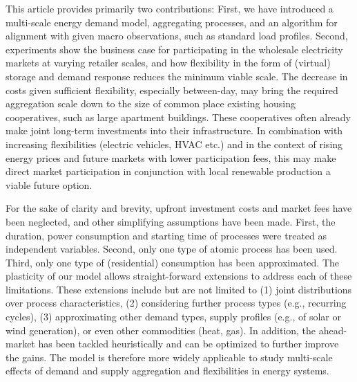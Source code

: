 \documentclass[conference]{IEEEtran}
\begin{document}
This article provides primarily two contributions: First, we have introduced a multi-scale energy demand model, aggregating processes, and an algorithm for alignment with given macro observations, such as standard load profiles. %
Second, experiments show the business case for participating in the wholesale electricity markets at varying retailer scales, and how flexibility in the form of (virtual) storage and demand response reduces the minimum viable scale. The decrease in costs given sufficient flexibility, especially between-day, may bring the required aggregation scale down to the size of common place existing housing cooperatives, such as large apartment buildings. These cooperatives often already make joint long-term investments into their infrastructure. In combination with increasing flexibilities (electric vehicles, HVAC etc.) and in the context of rising energy prices and future markets with lower participation fees, this may make direct market participation in conjunction with local renewable production a viable future option.

For the sake of clarity and brevity, upfront investment costs and market fees have been neglected, and other simplifying assumptions have been made. First, the duration, power consumption and starting time of processes were treated as independent variables. Second, only one type of atomic process has been used. Third, only one type of (residential) consumption has been approximated. %
% 
The plasticity of our model allows straight-forward extensions to address each of these limitations. These extensions include but are not limited to (1) joint distributions over process characteristics, (2) considering further process types (e.g., recurring cycles), (3) approximating other demand types, supply profiles (e.g., of solar or wind generation), or even other commodities (heat, gas). In addition, the ahead-market has been tackled heuristically and can be optimized to further improve the gains. %
The model is therefore more widely applicable to study multi-scale effects of demand and supply aggregation and flexibilities in energy systems.



\balance

\end{document}
